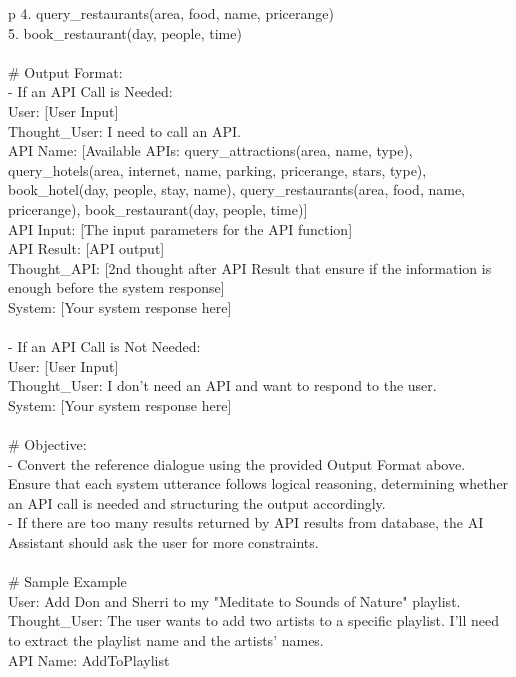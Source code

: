 \begin{table*}
\begin{tabular}{p\linewidth}
4. query\_restaurants(area, food, name, pricerange) \\
5. book\_restaurant(day, people, time) \\
 \\
\# Output Format: \\
- If an API Call is Needed: \\
\quad	User: [User Input] \\
\quad    Thought\_User: I need to call an API. \\
\quad    API Name: [Available APIs: query\_attractions(area, name, type), query\_hotels(area, internet, name, parking, pricerange, stars, type), book\_hotel(day, people, stay, name), query\_restaurants(area, food, name, pricerange), book\_restaurant(day, people, time)] \\
\quad    API Input: [The input parameters for the API function] \\
 \quad   API Result: [API output] \\
 \quad   Thought\_API: [2nd thought after API Result that ensure if the information is enough before the system response] \\
\quad	System: [Your system response here] \\
 \\
- If an API Call is Not Needed: \\
\quad	User: [User Input] \\
 \quad   Thought\_User: I don't need an API and want to respond to the user. \\
 \quad   System: [Your system response here] \\
 \\
\# Objective:  \\
- Convert the reference dialogue using the provided Output Format above. Ensure that each system utterance follows logical reasoning, determining whether an API call is needed and structuring the output accordingly. \\
- If there are too many results returned by API results from database, the AI Assistant should ask the user for more constraints. \\
 \\
\# Sample Example \\
User: Add Don and Sherri to my "Meditate to Sounds of Nature" playlist.   \\
Thought\_User: The user wants to add two artists to a specific playlist. I'll need to extract the playlist name and the artists' names.   \\
API Name: AddToPlaylist   \\

\end{tabular}
\end{table*}
